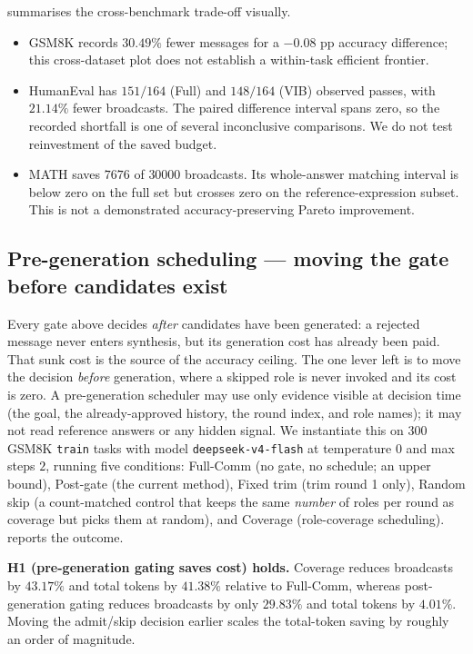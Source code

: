 \documentclass[11pt,twoside,twocolumn,letterpaper]{article}
\begin{document}
 summarises the cross-benchmark trade-off visually.
\begin{itemize}
\item GSM8K records $30.49\%$ fewer messages for a $-0.08$ pp accuracy difference; this cross-dataset plot does not establish a within-task efficient frontier.
\item HumanEval has $151/164$ (Full) and $148/164$ (VIB) observed passes, with $21.14\%$ fewer broadcasts. The paired difference interval spans zero, so the recorded shortfall is one of several inconclusive comparisons. We do not test reinvestment of the saved budget.
\item MATH saves $7676$ of $30000$ broadcasts. Its whole-answer matching interval is below zero on the full set but crosses zero on the reference-expression subset. This is not a demonstrated accuracy-preserving Pareto improvement.
\end{itemize}

\subsection{Pre-generation scheduling --- moving the gate before candidates exist}

Every gate above decides \emph{after} candidates have been generated: a rejected message never enters synthesis, but its generation cost has already been paid. That sunk cost is the source of the accuracy ceiling. The one lever left is to move the decision \emph{before} generation, where a skipped role is never invoked and its cost is zero. A pre-generation scheduler may use only evidence visible at decision time (the goal, the already-approved history, the round index, and role names); it may not read reference answers or any hidden signal. We instantiate this on $300$ GSM8K \texttt{train} tasks with model \texttt{deepseek-v4-flash} at temperature $0$ and max steps $2$, running five conditions: Full-Comm (no gate, no schedule; an upper bound), Post-gate (the current method), Fixed trim (trim round 1 only), Random skip (a count-matched control that keeps the same \emph{number} of roles per round as coverage but picks them at random), and Coverage (role-coverage scheduling).  reports the outcome.

\textbf{H1 (pre-generation gating saves cost) holds.} Coverage reduces broadcasts by $43.17\%$ and total tokens by $41.38\%$ relative to Full-Comm, whereas post-generation gating reduces broadcasts by only $29.83\%$ and total tokens by $4.01\%$. Moving the admit/skip decision earlier scales the total-token saving by roughly an order of magnitude.
\end{document}
